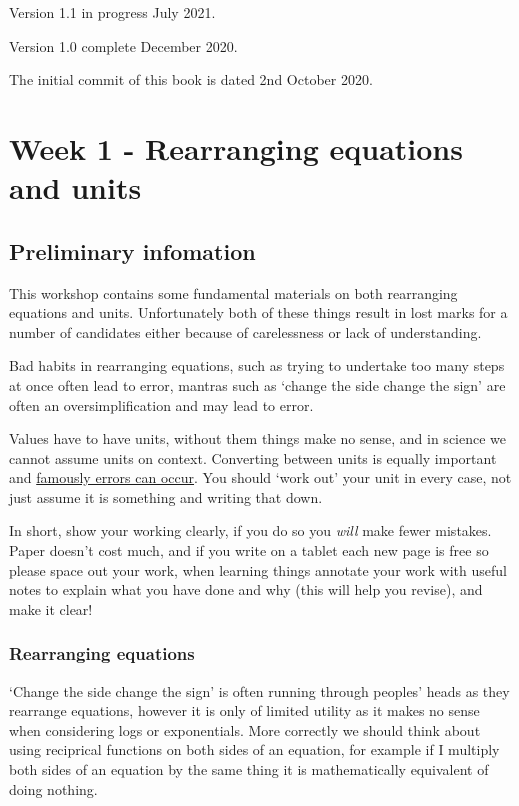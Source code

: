 \documentclass[
]{book}
\begin{document}
Version 1.1 in progress July 2021.

Version 1.0 complete December 2020.

The initial commit of this book is dated 2nd October 2020.

\hypertarget{ch:Workshop1}{%
\chapter{Week 1 - Rearranging equations and units}\label{ch:Workshop1}}

\hypertarget{sec:Prelim}{%
\section{Preliminary infomation}\label{sec:Prelim}}

This workshop contains some fundamental materials on both rearranging equations and units. Unfortunately both of these things result in lost marks for a number of candidates either because of carelessness or lack of understanding.

Bad habits in rearranging equations, such as trying to undertake too many steps at once often lead to error, mantras such as `change the side change the sign' are often an oversimplification and may lead to error.

Values have to have units, without them things make no sense, and in science we cannot assume units on context. Converting between units is equally important and \href{https://www.bbc.co.uk/news/uk-england-tyne-38744307}{famously errors can occur}. You should `work out' your unit in every case, not just assume it is something and writing that down.

In short, show your working clearly, if you do so you \emph{will} make fewer mistakes. Paper doesn't cost much, and if you write on a tablet each new page is free so please space out your work, when learning things annotate your work with useful notes to explain what you have done and why (this will help you revise), and make it clear!

\hypertarget{rearranging-equations}{%
\subsection{Rearranging equations}\label{rearranging-equations}}

`Change the side change the sign' is often running through peoples' heads as they rearrange equations, however it is only of limited utility as it makes no sense when considering logs or exponentials. More correctly we should think about using reciprical functions on both sides of an equation, for example if I multiply both sides of an equation by the same thing it is mathematically equivalent of doing nothing.
\end{document}
